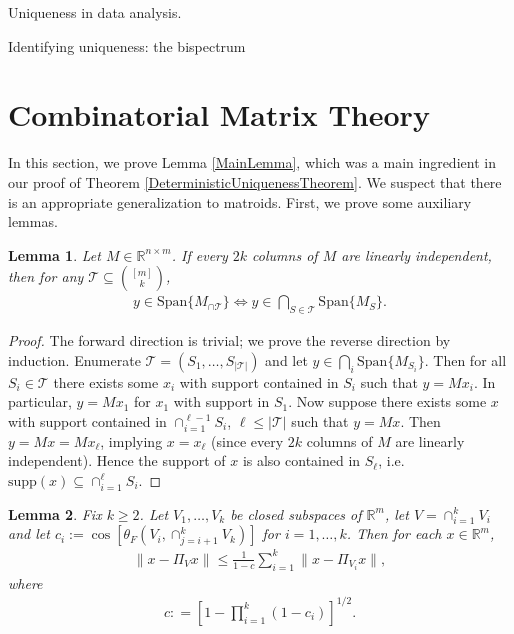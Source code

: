 \documentclass[journal, onecolumn]{IEEEtran}
\newtheorem{lemma}{Lemma}
\begin{document}
Uniqueness in data analysis.

Identifying uniqueness: the bispectrum


\appendices
\section{Combinatorial Matrix Theory}

In this section, we prove Lemma \ref{MainLemma}, which was a main ingredient in our proof of Theorem \ref{DeterministicUniquenessTheorem}. We suspect that there is an appropriate generalization to matroids. First, we prove some auxiliary lemmas. 


\begin{lemma}\label{SpanIntersectionLemma}
Let $M \in \mathbb{R}^{n \times m}$. If every $2k$ columns of $M$ are linearly independent, then for any $\mathcal{T} \subseteq {[m] \choose k}$,
\begin{align}
y \in \text{Span}\{M_{\cap \mathcal{T}}\}  \Longleftrightarrow y \in \bigcap_{S \in \mathcal{T}} \text{Span}\{M_S\}.
\end{align}
\end{lemma}

\begin{proof}The forward direction is trivial; we prove the reverse direction by induction. Enumerate $\mathcal{T} = (S_1, \ldots, S_{|\mathcal{T}|})$ and let $y \in \bigcap_i \text{Span}\{M_{S_i}\}$. Then for all $S_i \in \mathcal{T}$ there exists some $x_i$ with support contained in $S_i$ such that $y = Mx_i$. In particular, $y = Mx_1$ for $x_1$ with support in $S_1$. Now suppose there exists some $x$ with support contained in $\cap_{i=1}^{\ell-1}S_i$, $\ell \leq |\mathcal{T}|$ such that $y = Mx$. Then $y = Mx = Mx_\ell$, implying $x = x_\ell$ (since every $2k$ columns of $M$ are linearly independent). Hence the support of $x$ is also contained in  $S_\ell$, i.e. $\text{supp}(x) \subseteq \cap_{i=1}^\ell S_i$. 
\end{proof}


\begin{lemma}\label{DistanceToIntersectionLemma}
Fix $k \geq 2$. Let $V_1, \ldots, V_k$ be closed subspaces of $\mathbb{R}^m$, let $V = \cap_{i=1}^k V_i$ and let $c_i := \cos\left[ \theta_F \left( V_i, \cap_{j=i+1}^k V_k \right) \right]$ for $i = 1, \ldots, k$. Then for each $x \in \mathbb{R}^m$,
\begin{align}\label{DTILeq}
\|x - \Pi_V x\| \leq \frac{1}{1 - c} \sum_{i=1}^k \|x - \Pi_{V_i} x\|,
\end{align}
%
where
\begin{align}\label{cdef}
c: = \left[ 1 - \prod_{i=1}^k(1 - c_i) \right]^{1/2}.
\end{align}
\end{lemma}
\end{document}
